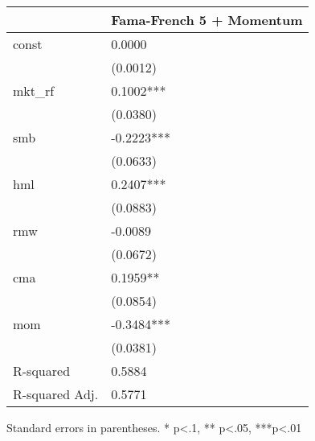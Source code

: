 \begin{table}
\caption{}
\label{}
\begin{center}
\begin{tabular}{ll}
\hline
               & Fama-French 5 + Momentum  \\
\hline
const          & 0.0000                    \\
               & (0.0012)                  \\
mkt\_rf        & 0.1002***                 \\
               & (0.0380)                  \\
smb            & -0.2223***                \\
               & (0.0633)                  \\
hml            & 0.2407***                 \\
               & (0.0883)                  \\
rmw            & -0.0089                   \\
               & (0.0672)                  \\
cma            & 0.1959**                  \\
               & (0.0854)                  \\
mom            & -0.3484***                \\
               & (0.0381)                  \\
R-squared      & 0.5884                    \\
R-squared Adj. & 0.5771                    \\
\hline
\end{tabular}
\end{center}
\end{table}
\bigskip
Standard errors in parentheses. \newline 
* p<.1, ** p<.05, ***p<.01